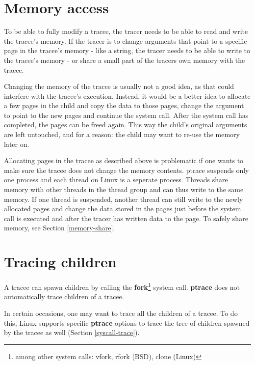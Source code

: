\documentclass[a4paper, 10pt]{report}
\begin{document}
\section{Memory access}

To be able to fully modify a tracee, the tracer needs to be able to
read and write the tracee's memory. If the tracer is to change
arguments that point to a specific page in the tracee's memory - like a string,
the tracer needs to be able to write to the tracee's memory - or
share a small part of the tracers own memory with the tracee.

Changing the memory of the tracee is usually not a good idea, as that could
interfere with the tracee's execution.
Instead, it would be a better idea to allocate a few pages in the
child and copy the data to those pages, change the argument to point to the new
pages and continue the system call. After the system call has completed, the
pages can be freed again. This way the child's original arguments are left
untouched, and for a reason: the child may want to re-use the memory later on.

Allocating pages in the tracee as described above is problematic if one wants
to make sure the tracee does not change the memory contents. ptrace suspends
only one process and each thread on Linux is a seperate process. Threads share
memory with other threads in the thread group and can thus write to the same
memory. If one thread is suspended, another thread can still write to the newly
allocated pages and change the data stored in the pages just before the system
call is executed and after the tracer has written data to the page. To safely
share memory, see Section \ref{memory-share}.



\section{Tracing children}

A tracee can spawn children by calling the \textbf{fork}\footnote{among
    other system calls: vfork, rfork (BSD), clone (Linux)} system call. \textbf{ptrace}
does not automatically trace children of a tracee.

In certain occasions, one may want to trace all the children of a tracee.
To do this, Linux supports specific \textbf{ptrace} options to trace
the tree of children spawned by the tracee as well (Section
\ref{syscall-trace}).
\end{document}
